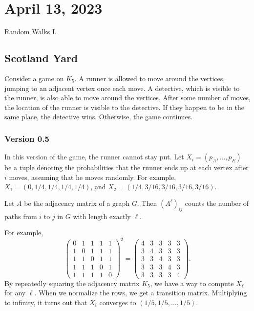 \section{April 13, 2023}

Random Walks I. 

\subsection{Scotland Yard}

Consider a game on $K_5$. A runner is allowed to move around the vertices, jumping to an adjacent vertex once each move. A detective, which is visible to the runner, is also able to move around the vertices. After some number of moves, the location of the runner is visible to the detective. If they happen to be in the same place, the detective wins. Otherwise, the game continues. 

\subsubsection{Version 0.5}

In this version of the game, the runner cannot stay put. Let $X_i=(p_A, \hdots, p_E)$ be a tuple denoting the probabilities that the runner ends up at each vertex after $i$ moves, assuming that he moves randomly. For example, $X_1 = (0,1/4,1/4,1/4,1/4)$, and $X_2=(1/4,3/16,3/16,3/16,3/16)$. 

\begin{theorem}
\claimlabel

Let $A$ be the adjacency matrix of a graph $G$. Then $(A^{\ell})_{ij}$ counts the number of paths from $i$ to $j$ in $G$ with length exactly $\ell$. 
\end{theorem}

For example, 
\[
\begin{pmatrix}
0 & 1 & 1 & 1 & 1 \\
1 & 0 & 1 & 1 & 1 \\
1 & 1 & 0 & 1 & 1 \\
1 & 1 & 1 & 0 & 1\\
1 & 1 & 1 & 1 & 0
\end{pmatrix}^2 = \begin{pmatrix}
4 & 3 & 3 & 3 & 3 \\
3 & 4 & 3 & 3 & 3 \\
3 & 3 & 4 & 3 & 3 \\
3 & 3 & 3 & 4 & 3\\
3 & 3 & 3 & 3 & 4
\end{pmatrix}.
\]
By repeatedly squaring the adjacency matrix $K_5$, we have a way to compute $X_{\ell}$ for any $\ell$. When we normalize the rows, we get a \ac{transition matrix}. Multiplying to infinity, it turns out that $X_i$ converges to $(1/5, 1/5, \hdots, 1/5)$. 

